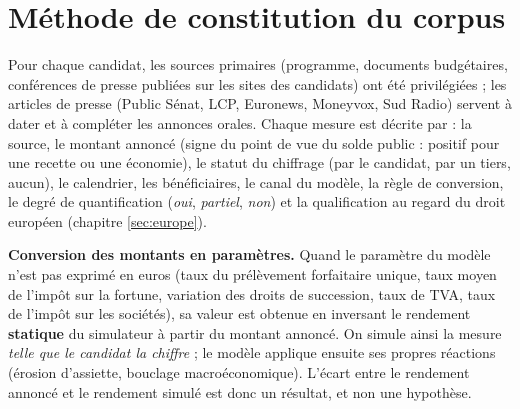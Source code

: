 \documentclass[
  11pt,
  11pt,
  a4paper,
  openany]{book}
\begin{document}
\hypertarget{sec:methode-corpus}{%
\section{Méthode de constitution du corpus}\label{sec:methode-corpus}}

Pour chaque candidat, les sources primaires (programme, documents
budgétaires, conférences de presse publiées sur les sites des candidats)
ont été privilégiées ; les articles de presse (Public Sénat, LCP,
Euronews, Moneyvox, Sud Radio) servent à dater et à compléter les
annonces orales. Chaque mesure est décrite par : la source, le montant
annoncé (signe du point de vue du solde public : positif pour une
recette ou une économie), le statut du chiffrage (par le candidat, par
un tiers, aucun), le calendrier, les bénéficiaires, le canal du modèle,
la règle de conversion, le degré de quantification (\emph{oui},
\emph{partiel}, \emph{non}) et la qualification au regard du droit
européen (chapitre \ref{sec:europe}).

\textbf{Conversion des montants en paramètres.} Quand le paramètre du
modèle n'est pas exprimé en euros (taux du prélèvement forfaitaire
unique, taux moyen de l'impôt sur la fortune, variation des droits de
succession, taux de TVA, taux de l'impôt sur les sociétés), sa valeur
est obtenue en inversant le rendement \textbf{statique} du simulateur à
partir du montant annoncé. On simule ainsi la mesure \emph{telle que le
candidat la chiffre} ; le modèle applique ensuite ses propres réactions
(érosion d'assiette, bouclage macroéconomique). L'écart entre le
rendement annoncé et le rendement simulé est donc un résultat, et non
une hypothèse.
\end{document}
